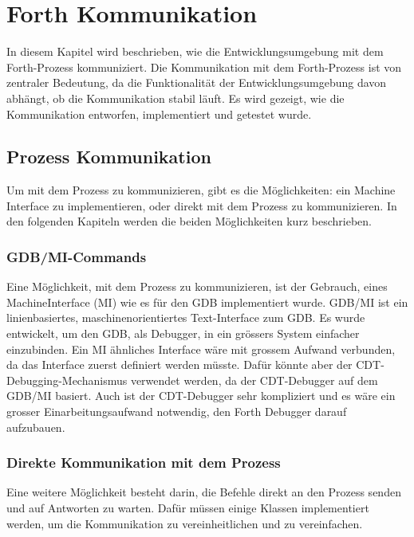 \chapter{Forth Kommunikation}
\label{chap:forthcommunication}

In diesem Kapitel wird beschrieben, wie die Entwicklungsumgebung mit dem Forth-Prozess kommuniziert. Die Kommunikation mit dem Forth-Prozess ist von zentraler Bedeutung, da die Funktionalität der Entwicklungsumgebung davon abhängt, ob die Kommunikation stabil läuft. Es wird gezeigt, wie die Kommunikation entworfen, implementiert und getestet wurde.

\section{Prozess Kommunikation}
Um mit dem Prozess zu kommunizieren, gibt es die Möglichkeiten: ein Machine Interface zu implementieren, oder direkt mit dem Prozess zu kommunizieren. In den folgenden Kapiteln werden die beiden Möglichkeiten kurz beschrieben.

\subsection{GDB/MI-Commands}

Eine Möglichkeit, mit dem Prozess zu kommunizieren, ist der Gebrauch, eines MachineInterface (MI) wie es für den GDB implementiert wurde. GDB/MI ist ein linienbasiertes, maschinenorientiertes Text-Interface zum GDB. Es wurde entwickelt, um den GDB, als Debugger, in ein grössers System einfacher einzubinden.\cite{gdb} Ein MI ähnliches Interface wäre mit grossem Aufwand verbunden, da das Interface zuerst definiert werden müsste. Dafür könnte aber der CDT-Debugging-Mechanismus verwendet werden, da der CDT-Debugger auf dem GDB/MI basiert. Auch ist der CDT-Debugger sehr kompliziert\cite{mieclipse} und es wäre ein grosser Einarbeitungsaufwand notwendig, den Forth Debugger darauf aufzubauen.\cite{mieclipse}

\subsection{Direkte Kommunikation mit dem Prozess}

Eine weitere Möglichkeit besteht darin, die Befehle direkt an den Prozess senden und auf Antworten zu warten. Dafür müssen einige Klassen implementiert werden, um die Kommunikation zu vereinheitlichen und zu vereinfachen.

